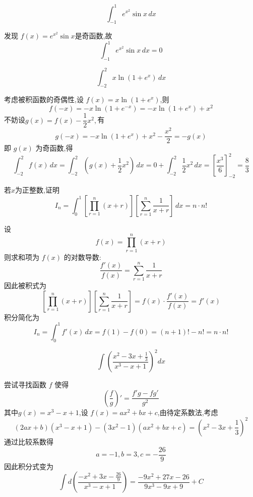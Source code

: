 \begin{questions}
    \question 
    \[
    \int _{-1}^{1}e^{x^{2}}\sin x\,dx
    \]
    \begin{solution}
        发现 $f(x)=e^{x^{2}}\sin x$是奇函数,故
        \[
        \int _{-1}^{1}e^{x^{2}}\sin x\,dx =0
        \]
    \end{solution}

    \question 
    \[
    \int_{-2}^{2} x \ln(1+e^x)\, dx
    \]
    \begin{solution}
        考虑被积函数的奇偶性,设 \( f(x) = x \ln(1 + e^x) \),则
        \[
        f(-x) = -x \ln(1 + e^{-x}) = -x \ln(1 + e^x) + x^2
        \]
        不妨设$g(x) = f(x) - \dfrac{1}{2}x^2,$有
        \[
        g(-x) = -x\ln(1+e^x) + x^2 - \frac{x^2}{2} = -g(x)
        \]
        即 \( g(x) \) 为奇函数,得
        \[
        \int_{-2}^{2} f(x)\,dx 
        = \int_{-2}^{2} \left(g(x) + \frac{1}{2}x^2\right)\,dx 
        = 0 + \int_{-2}^{2} \frac{1}{2}x^2 \,dx
        = \left[\frac{x^3}{6}\right]_{-2}^2
        = \frac{8}{3}
        \]
    \end{solution}

    \question 若$x$为正整数,证明
    \[
    I_n = \int_{0}^{1} \left[ \prod_{r=1}^{n} (x+r) \right] \left[ \sum_{r=1}^{n} \frac{1}{x+r} \right] \, dx = n \cdot n!
    \]
    \begin{solution}
        设 
        \[
        f(x) = \prod_{r=1}^{n} (x+r)
        \]
        则求和项为 $f(x)$ 的对数导数:
        \[
        \frac{f'(x)}{f(x)} = \sum_{r=1}^{n} \frac{1}{x+r}
        \]
        因此被积式为
        \[
        \left[ \prod_{r=1}^{n} (x+r) \right] \left[ \sum_{r=1}^{n} \frac{1}{x+r} \right] = f(x) \cdot \frac{f'(x)}{f(x)} = f'(x)
        \]
        积分简化为
        \[
        I_n = \int_{0}^{1} f'(x) \, dx = f(1) - f(0) =(n+1)!-n!=n \cdot n!
        \]
    \end{solution}

    \question
    \[ 
    \int \left( \frac{x^2 - 3x + \frac{1}{3}}{x^3 - x + 1} \right)^2 dx 
    \]
    \begin{solution}
        尝试寻找函数 $f$ 使得
        \[ 
        \left( \frac{f}{g} \right)' = \frac{f'g - fg'}{g^2}
        \]
        其中$g(x) = x^3 - x + 1$,设 $f(x) = ax^2 + bx + c$,由待定系数法,考虑
        \[ 
        (2ax+b)(x^3-x+1) - (3x^2-1)(ax^2+bx+c) = (x^2-3x+\frac{1}{3})^2 
        \]
        通过比较系数得
        \[
        a = -1, b = 3, c = -\frac{26}{9}
        \]
        因此积分式变为
        \[ 
        \int d\left( \frac{-x^2 + 3x - \frac{26}{9}}{x^3 - x + 1} \right) = \frac{-9x^2 + 27x - 26}{9x^3 - 9x + 9} + C
        \]
    \end{solution}


\end{questions}

